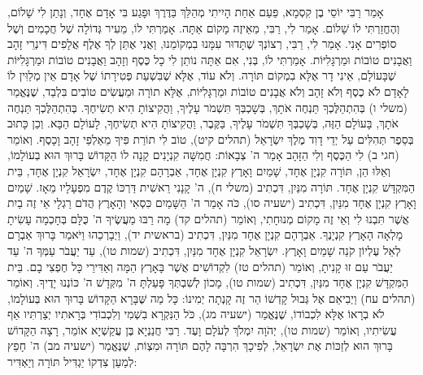אָמַר רַבִּי יוֹסֵי בֶן קִסְמָא, פַּעַם אַחַת הָיִיתִי מְהַלֵּךְ בַּדֶּרֶךְ וּפָגַע בִּי אָדָם אֶחָד, וְנָתַן לִי שָׁלוֹם, וְהֶחֱזַרְתִּי לוֹ שָׁלוֹם. אָמַר לִי, רַבִּי, מֵאֵיזֶה מָקוֹם אַתָּה. אָמַרְתִּי לוֹ, מֵעִיר גְּדוֹלָה שֶׁל חֲכָמִים וְשֶׁל סוֹפְרִים אָנִי. אָמַר לִי, רַבִּי, רְצוֹנְךָ שֶׁתָּדוּר עִמָּנוּ בִמְקוֹמֵנוּ, וַאֲנִי אֶתֵּן לְךָ אֶלֶף אֲלָפִים דִּינְרֵי זָהָב וַאֲבָנִים טוֹבוֹת וּמַרְגָּלִיּוֹת. אָמַרְתִּי לוֹ, בְּנִי, אִם אַתָּה נוֹתֵן לִי כָל כֶּסֶף וְזָהָב וַאֲבָנִים טוֹבוֹת וּמַרְגָּלִיּוֹת שֶׁבָּעוֹלָם, אֵינִי דָר אֶלָּא בִמְקוֹם תּוֹרָה. וְלֹא עוֹד, אֶלָּא שֶׁבִּשְׁעַת פְּטִירָתוֹ שֶׁל אָדָם אֵין מְלַוִּין לוֹ לָאָדָם לֹא כֶסֶף וְלֹא זָהָב וְלֹא אֲבָנִים טוֹבוֹת וּמַרְגָּלִיּוֹת, אֶלָּא תוֹרָה וּמַעֲשִׂים טוֹבִים בִּלְבַד, שֶׁנֶּאֱמַר (משלי ו) בְּהִתְהַלֶּכְךָ תַּנְחֶה אֹתָךְ, בְּשָׁכְבְּךָ תִּשְׁמֹר עָלֶיךָ, וַהֲקִיצוֹתָ הִיא תְשִׂיחֶךָ. בְּהִתְהַלֶּכְךָ תַּנְחֶה אֹתָךְ, בָּעוֹלָם הַזֶּה, בְּשָׁכְבְּךָ תִּשְׁמֹר עָלֶיךָ, בַּקֶּבֶר, וַהֲקִיצוֹתָ הִיא תְשִׂיחֶךָ, לָעוֹלָם הַבָּא. וְכֵן כָּתוּב בְּסֵפֶר תְּהִלִּים עַל יְדֵי דָוִד מֶלֶךְ יִשְׂרָאֵל (תהלים קיט), טוֹב לִי תוֹרַת פִּיךָ מֵאַלְפֵי זָהָב וָכָסֶף. וְאוֹמֵר (חגי ב) לִי הַכֶּסֶף וְלִי הַזָּהָב אָמַר ה' צְבָאוֹת:
חֲמִשָּׁה קִנְיָנִים קָנָה לוֹ הַקָּדוֹשׁ בָּרוּךְ הוּא בְעוֹלָמוֹ, וְאֵלּוּ הֵן, תּוֹרָה קִנְיָן אֶחָד, שָׁמַיִם וָאָרֶץ קִנְיָן אֶחָד, אַבְרָהָם קִנְיָן אֶחָד, יִשְׂרָאֵל קִנְיָן אֶחָד, בֵּית הַמִּקְדָּשׁ קִנְיָן אֶחָד. תּוֹרָה מִנַּיִן, דִּכְתִיב (משלי ח), ה' קָנָנִי רֵאשִׁית דַּרְכּוֹ קֶדֶם מִפְעָלָיו מֵאָז. שָׁמַיִם וָאָרֶץ קִנְיָן אֶחָד מִנַּיִן, דִּכְתִיב (ישעיה סו), כֹּה אָמַר ה' הַשָּׁמַיִם כִּסְאִי וְהָאָרֶץ הֲדֹם רַגְלָי אֵי זֶה בַיִת אֲשֶׁר תִּבְנוּ לִי וְאֵי זֶה מָקוֹם מְנוּחָתִי, וְאוֹמֵר (תהלים קד) מָה רַבּוּ מַעֲשֶׂיךָ ה' כֻּלָּם בְּחָכְמָה עָשִׂיתָ מָלְאָה הָאָרֶץ קִנְיָנֶךָ. אַבְרָהָם קִנְיָן אֶחָד מִנַּיִן, דִּכְתִיב (בראשית יד), וַיְבָרְכֵהוּ וַיֹּאמַר בָּרוּךְ אַבְרָם לְאֵל עֶלְיוֹן קֹנֵה שָׁמַיִם וָאָרֶץ. יִשְׂרָאֵל קִנְיָן אֶחָד מִנַּיִן, דִּכְתִיב (שמות טו), עַד יַעֲבֹר עַמְּךָ ה' עַד יַעֲבֹר עַם זוּ קָנִיתָ, וְאוֹמֵר (תהלים טז) לִקְדוֹשִׁים אֲשֶׁר בָּאָרֶץ הֵמָּה וְאַדִּירֵי כָּל חֶפְצִי בָם. בֵּית הַמִּקְדָּשׁ קִנְיָן אֶחָד מִנַּיִן, דִּכְתִיב (שמות טו), מָכוֹן לְשִׁבְתְּךָ פָּעַלְתָּ ה' מִקְּדָשׁ ה' כּוֹנְנוּ יָדֶיךָ. וְאוֹמֵר (תהלים עח) וַיְבִיאֵם אֶל גְּבוּל קָדְשׁוֹ הַר זֶה קָנְתָה יְמִינוֹ:
כָּל מַה שֶּׁבָּרָא הַקָּדוֹשׁ בָּרוּךְ הוּא בְּעוֹלָמוֹ, לֹא בְרָאוֹ אֶלָּא לִכְבוֹדוֹ, שֶׁנֶּאֱמַר (ישעיה מג), כֹּל הַנִּקְרָא בִשְׁמִי וְלִכְבוֹדִי בְּרָאתִיו יְצַרְתִּיו אַף עֲשִׂיתִיו, וְאוֹמֵר (שמות טו), יְהֹוָה יִמְלֹךְ לְעֹלָם וָעֶד. רַבִּי חֲנַנְיָא בֶּן עֲקַשְׁיָא אוֹמֵר, רָצָה הַקָּדוֹשׁ בָּרוּךְ הוּא לְזַכּוֹת אֶת יִשְׂרָאֵל, לְפִיכָךְ הִרְבָּה לָהֶם תּוֹרָה וּמִצְוֹת, שֶׁנֶּאֱמַר (ישעיה מב) ה' חָפֵץ לְמַעַן צִדְקוֹ יַגְדִּיל תּוֹרָה וְיַאְדִּיר: